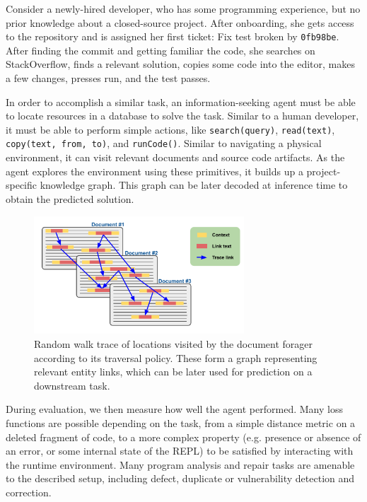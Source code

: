 \documentclass[11pt]{article}
\begin{document}
Consider a newly-hired developer, who has some programming experience, but no prior knowledge about a closed-source project. After onboarding, she gets access to the repository and is assigned her first ticket: Fix test broken by \texttt{0fb98be}. After finding the commit and getting familiar the code, she searches on StackOverflow, finds a relevant solution, copies some code into the editor, makes a few changes, presses run, and the test passes.

In order to accomplish a similar task, an information-seeking agent must be able to locate resources in a database to solve the task. Similar to a human developer, it must be able to perform simple actions, like \texttt{search(query)}, \texttt{read(text)}, \texttt{copy(text, from, to)}, and \texttt{runCode()}. Similar to navigating a physical environment, it can visit relevant documents and source code artifacts. As the agent explores the environment using these primitives, it builds up a project-specific knowledge graph. This graph can be later decoded at inference time to obtain the predicted solution.

\begin{figure}
  \centering
  \includegraphics[width=0.7\textwidth]{use_graph}
  \caption{Random walk trace of locations visited by the document forager according to its traversal policy. These form a graph representing relevant entity links, which can be later used for prediction on a downstream task.}
\end{figure}

During evaluation, we then measure how well the agent performed. Many loss functions are possible depending on the task, from a simple distance metric on a deleted fragment of code, to a more complex property (e.g. presence or absence of an error, or some internal state of the REPL) to be satisfied by interacting with the runtime environment. Many program analysis and repair tasks are amenable to the described setup, including defect, duplicate or vulnerability detection and correction.
\end{document}
